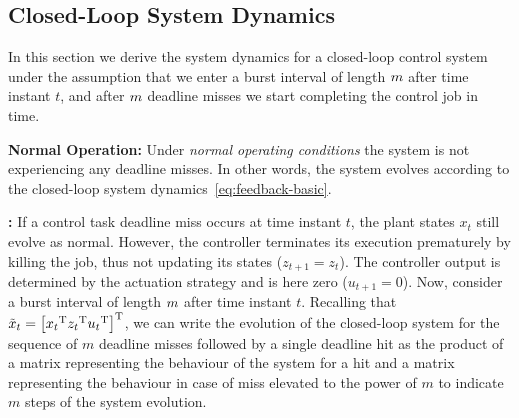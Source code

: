 \subsection{Closed-Loop System Dynamics}%
\label{sec:derivation}
In this section we derive the system dynamics for a closed-loop control system under the assumption that we enter a burst interval of length $m$ after time instant $t$, and after $m$ deadline misses we start completing the control job in time.

\textbf{Normal Operation: }%
Under \emph{normal operating conditions} the system is not experiencing any deadline misses.
In other words, the system evolves according to the closed-loop system dynamics~\eqref{eq:feedback-basic}.

\textbf{\tKZ{}: }%
%
If a control task deadline miss occurs at time instant $t$, the plant states $x_t$ still evolve as normal.
However, the controller terminates its execution prematurely by killing the job, thus not updating its states ($z_{t+1} = z_t$).
The controller output is determined by the actuation strategy and is here zero ($u_{t+1} = 0$).
Now, consider a burst interval of length $m$ after time instant $t$.
Recalling that $\tilde{x}_t = \left[ {x_t}^{\mathrm{\small{T}}} {z_t}^{\mathrm{\small{T}}} {u_t}^{\mathrm{\small{T}}} \right]^{\mathrm{\small{T}}}$, we can write the evolution of the closed-loop system for the sequence of $m$ deadline misses followed by a single deadline hit as the product of a matrix representing the behaviour of the system for a hit and a matrix representing the behaviour in case of miss elevated to the power of $m$ to indicate $m$ steps of the system evolution.

